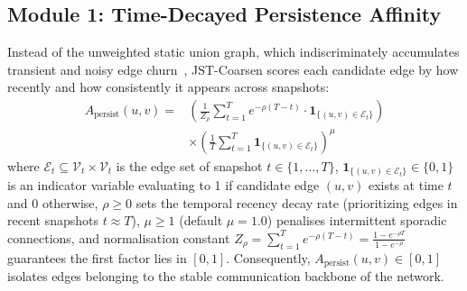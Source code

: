 \documentclass[sigconf]{acmart}
\begin{document}
\subsection{Module 1: Time-Decayed Persistence Affinity}
\label{sec:module1}
Instead of the unweighted static union graph, which indiscriminately accumulates transient and noisy edge churn~\cite{loukas2019graph}, JST-Coarsen scores each candidate edge by how recently and how consistently it appears across snapshots:
\begin{equation}
\label{eq:persist}
\begin{split}
A_{\text{persist}}(u, v) = {}& \left( \frac{1}{Z_\rho} \sum_{t=1}^T e^{-\rho (T - t)} \cdot \mathbf{1}_{\{(u, v) \in \mathcal{E}_t\}} \right) \\
& \times \left( \frac{1}{T} \sum_{t=1}^T \mathbf{1}_{\{(u, v) \in \mathcal{E}_t\}} \right)^\mu
\end{split}
\end{equation}
where $\mathcal{E}_t \subseteq \mathcal{V}_t \times \mathcal{V}_t$ is the edge set of snapshot $t \in \{1, \dots, T\}$, $\mathbf{1}_{\{(u, v) \in \mathcal{E}_t\}} \in \{0, 1\}$ is an indicator variable evaluating to 1 if candidate edge $(u, v)$ exists at time $t$ and 0 otherwise, $\rho \ge 0$ sets the temporal recency decay rate (prioritizing edges in recent snapshots $t \approx T$), $\mu \ge 1$ (default $\mu = 1.0$) penalises intermittent sporadic connections, and normalisation constant $Z_\rho = \sum_{t=1}^T e^{-\rho (T - t)} = \frac{1 - e^{-\rho T}}{1 - e^{-\rho}}$ guarantees the first factor lies in $[0, 1]$. Consequently, $A_{\text{persist}}(u, v) \in [0, 1]$ isolates edges belonging to the stable communication backbone of the network.
\end{document}
